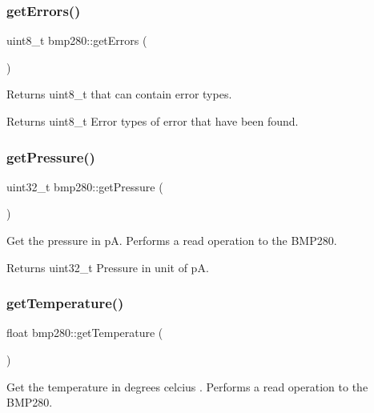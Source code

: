 \subsubsection{\texorpdfstring{getErrors()}{getErrors()}}
{\footnotesize\ttfamily uint8\+\_\+t bmp280\+::get\+Errors (\begin{DoxyParamCaption}{ }\end{DoxyParamCaption})}



Returns uint8\+\_\+t that can contain error types. 

\begin{DoxyReturn}{Returns}
uint8\+\_\+t Error types of error that have been found. 
\end{DoxyReturn}
\mbox{\label{classbmp280_a4c2b8a1a167683a819d2653c4be37bc9}} 
\subsubsection{\texorpdfstring{getPressure()}{getPressure()}}
{\footnotesize\ttfamily uint32\+\_\+t bmp280\+::get\+Pressure (\begin{DoxyParamCaption}{ }\end{DoxyParamCaption})}



Get the pressure in pA. Performs a read operation to the B\+M\+P280. 

\begin{DoxyReturn}{Returns}
uint32\+\_\+t Pressure in unit of pA. 
\end{DoxyReturn}
\mbox{\label{classbmp280_a7f3426799bc90f9435b22fa44a40387c}} 
\subsubsection{\texorpdfstring{getTemperature()}{getTemperature()}}
{\footnotesize\ttfamily float bmp280\+::get\+Temperature (\begin{DoxyParamCaption}{ }\end{DoxyParamCaption})}



Get the temperature in degrees celcius . Performs a read operation to the B\+M\+P280. 

